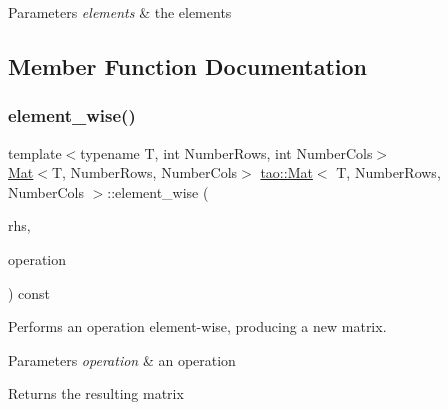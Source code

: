 \begin{DoxyParams}{Parameters}
{\em elements} & the elements \\
\hline
\end{DoxyParams}


\subsection{Member Function Documentation}
\mbox{\label{classtao_1_1_mat_a478949f4c6c7082ea0bfc78bf5d46b74}} 
\subsubsection{\texorpdfstring{element\_wise()}{element\_wise()}}
{\footnotesize\ttfamily template$<$typename T, int Number\+Rows, int Number\+Cols$>$ \\
\mbox{\hyperlink{classtao_1_1_mat}{Mat}}$<$T, Number\+Rows, Number\+Cols$>$ \mbox{\hyperlink{classtao_1_1_mat}{tao\+::\+Mat}}$<$ T, Number\+Rows, Number\+Cols $>$\+::element\+\_\+wise (\begin{DoxyParamCaption}\item[{const \mbox{\hyperlink{classtao_1_1_mat}{Mat}}$<$ T, Number\+Rows, Number\+Cols $>$ \&}]{rhs,  }\item[{std\+::function$<$ T(T, T)$>$}]{operation }\end{DoxyParamCaption}) const\hspace{0.3cm}{\ttfamily [inline]}}



Performs an operation element-\/wise, producing a new matrix. 


\begin{DoxyParams}{Parameters}
{\em operation} & an operation \\
\hline
\end{DoxyParams}
\begin{DoxyReturn}{Returns}
the resulting matrix 
\end{DoxyReturn}
\mbox{\label{classtao_1_1_mat_a4e0897f4d469def2d611be92f4b5d197}} 
